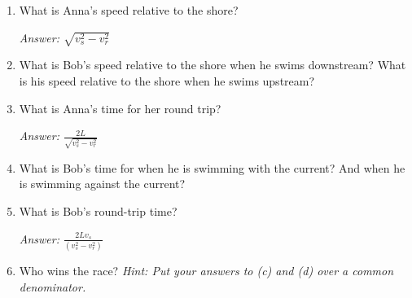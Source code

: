 \begin{enumerate}[labparts]

\item What is Anna's speed relative to the shore?
\answerspace{0.6in}

\hspace{\fill}\textit{Answer: $\sqrt{v_s^2-v_r^2}$}


\item What is Bob's speed relative to the shore when he swims downstream?  What is his speed relative to the shore when he swims upstream?
\answerspace{0.6in}


\item What is Anna's time for her round trip?
\answerspace{0.6in}

\hspace{\fill}\textit{Answer: $\displaystyle \frac{2L}{\sqrt{v_s^2-v_r^2}}$}

\item What is Bob's time for when he is swimming with the current?  And when he is swimming against the current?
\answerspace{0.6in}

\item What is Bob's round-trip time?
\answerspace{0.6in}

\hspace{\fill}\textit{Answer: $\displaystyle \frac{2Lv_s}{(v_s^2-v_r^2)}$}

\item Who wins the race? \textit{Hint: Put your answers to (c) and (d) over a common denominator.}
\answerspace{0.8in}

\end{enumerate}